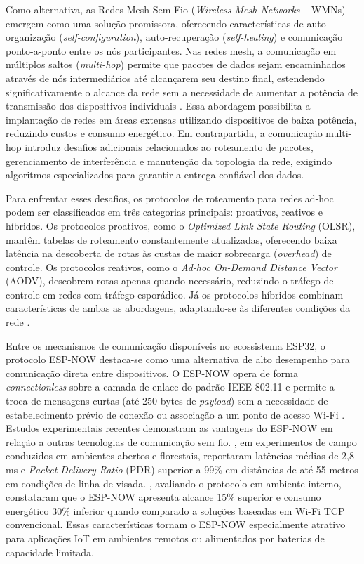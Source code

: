 Como alternativa, as Redes Mesh Sem Fio (\emph{Wireless Mesh Networks}
-- WMNs) emergem como uma solução promissora, oferecendo características
de auto-organização (\emph{self-configuration}), auto-recuperação
(\emph{self-healing}) e comunicação ponto-a-ponto entre os nós
participantes. Nas redes mesh, a comunicação em múltiplos saltos
(\emph{multi-hop}) permite que pacotes de dados sejam encaminhados
através de nós intermediários até alcançarem seu destino final,
estendendo significativamente o alcance da rede sem a necessidade de
aumentar a potência de transmissão dos dispositivos individuais
\cite{arregui2025}. Essa abordagem possibilita a implantação de redes em
áreas extensas utilizando dispositivos de baixa potência, reduzindo
custos e consumo energético. Em contrapartida, a comunicação multi-hop
introduz desafios adicionais relacionados ao roteamento de pacotes,
gerenciamento de interferência e manutenção da topologia da rede,
exigindo algoritmos especializados para garantir a entrega confiável dos
dados.

Para enfrentar esses desafios, os protocolos de roteamento para redes
ad-hoc podem ser classificados em três categorias principais: proativos,
reativos e híbridos. Os protocolos proativos, como o \emph{Optimized
Link State Routing} (OLSR), mantêm tabelas de roteamento constantemente
atualizadas, oferecendo baixa latência na descoberta de rotas às custas
de maior sobrecarga (\emph{overhead}) de controle. Os protocolos reativos, como o
\emph{Ad-hoc On-Demand Distance Vector} (AODV), descobrem rotas apenas
quando necessário, reduzindo o tráfego de controle em redes com tráfego
esporádico. Já os protocolos híbridos combinam características de ambas
as abordagens, adaptando-se às diferentes condições da rede
\cite{chaizeng2021}.

Entre os mecanismos de comunicação disponíveis no ecossistema ESP32, o
protocolo ESP-NOW destaca-se como uma alternativa de alto desempenho
para comunicação direta entre dispositivos. O ESP-NOW opera de forma
\emph{connectionless} sobre a camada
de enlace do padrão IEEE 802.11 e permite a troca de mensagens curtas
(até 250 bytes de \emph{payload}) sem a necessidade de estabelecimento
prévio de conexão ou associação a um ponto de acesso Wi-Fi
\cite{becker2025}. Estudos experimentais recentes demonstram as
vantagens do ESP-NOW em relação a outras tecnologias de comunicação sem
fio. , em experimentos de campo conduzidos em
ambientes abertos e florestais, reportaram latências médias de 2,8 ms e
\emph{Packet Delivery Ratio} (PDR) superior a 99\% em distâncias de até
55 metros em condições de linha de visada. ,
avaliando o protocolo em ambiente interno, constataram que o ESP-NOW
apresenta alcance 15\% superior e consumo energético 30\% inferior
quando comparado a soluções baseadas em Wi-Fi TCP convencional. Essas
características tornam o ESP-NOW especialmente atrativo para aplicações
IoT em ambientes remotos ou alimentados por baterias de capacidade
limitada.

